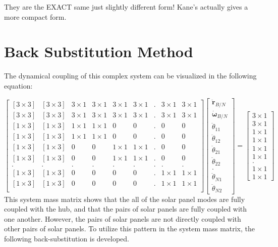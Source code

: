 \documentclass[paper]{aiaaNew}
\begin{document}
They are the EXACT same just slightly different form! Kane's actually gives a more compact form.

	\section{Back Substitution Method}
	The dynamical coupling of this complex system can be visualized in the following equation:
	
	\begin{equation}
	\begin{bmatrix}
	[3\times 3] & [3\times 3] & 3\times 1 & 3\times 1 & 3\times 1 & 3\times 1 & . & 3\times 1 & 3\times 1\\
	[3\times 3] & [3\times 3] & 3\times 1 & 3\times 1 & 3\times 1 & 3\times 1 & . & 3\times 1 & 3\times 1\\
	[1\times 3] & [1\times 3] & 1\times 1 & 1\times 1  & 0 & 0 & . & 0 & 0\\
	[1\times 3] & [1\times 3] & 1\times 1 & 1\times 1  & 0 & 0 & . & 0 & 0\\
	[1\times 3] & [1\times 3] & 0 & 0  & 1\times 1 & 1\times 1 & . & 0 & 0 \\
	[1\times 3] & [1\times 3] & 0 & 0  & 1\times 1 & 1\times 1 & . & 0 & 0\\
	. & . & . & . & . & . & . & . & .\\
	[1\times 3] & [1\times 3] & 0 & 0  & 0 & 0 & . & 1\times 1 & 1\times 1\\
	[1\times 3] & [1\times 3] & 0 & 0  & 0 & 0 & . & 1\times 1 & 1\times 1\\
	\end{bmatrix}
	\begin{bmatrix}
	\ddot{\boldsymbol{r}}_{B/N}\\
	\dot{\boldsymbol{\omega}}_{B/N}\\
	\ddot{\theta}_{11}\\
	\ddot{\theta}_{12}\\
	\ddot{\theta}_{21}\\
	\ddot{\theta}_{22}\\
	.\\
	\ddot{\theta}_{N1}\\
	\ddot{\theta}_{N2}
	\end{bmatrix}
	=
	\begin{bmatrix}
	3\times 1\\
	3\times 1\\
	1\times 1\\
	1\times 1\\
	1\times 1\\
	1\times 1\\
	.\\
	1\times 1\\
	1\times 1
	\end{bmatrix}
	\end{equation}
	This system mass matrix shows that the all of the solar panel modes are fully coupled with the hub, and that the pairs of solar panels are fully coupled with one another. However, the pairs of solar panels are not directly coupled with other pairs of solar panels. To utilize this pattern in the system mass matrix, the following back-substitution is developed. 
	
\end{document}
